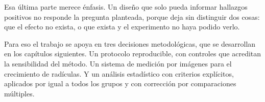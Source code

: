 Esa última parte merece énfasis. Un diseño que solo pueda informar hallazgos positivos no responde la pregunta planteada, porque deja sin distinguir dos cosas: que el efecto no exista, o que exista y el experimento no haya podido verlo.

Para eso el trabajo se apoya en tres decisiones metodológicas, que se desarrollan en los capítulos siguientes. Un protocolo reproducible, con controles que acreditan la sensibilidad del método. Un sistema de medición por imágenes para el crecimiento de radículas. Y un análisis estadístico con criterios explícitos, aplicados por igual a todos los grupos y con corrección por comparaciones múltiples.

\endinput
